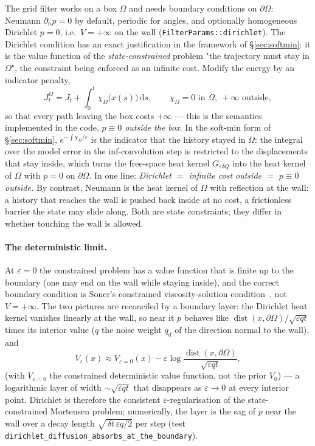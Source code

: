\documentclass[11pt,a4paper]{article}
\newcommand{\dd}{\,\mathrm{d}}
\newcommand{\eps}{\varepsilon}
\newcommand{\dt}{\,\delta t}
\theoremstyle{plain}
\theoremstyle{definition}
\theoremstyle{remark}
\begin{document}
The grid filter works on a box $\Omega$ and needs boundary conditions on $\partial\Omega$: Neumann $\partial_n p=0$ by default, periodic for angles, and optionally homogeneous Dirichlet $p=0$, i.e.\ $V=+\infty$ on the wall (\texttt{FilterParams::dirichlet}). The Dirichlet condition has an exact justification in the framework of \S\ref{sec:softmin}: it is the value function of the \emph{state-constrained} problem "the trajectory must stay in $\Omega$", the constraint being enforced as an infinite cost. Modify the energy by an indicator penalty,
\[
  J_t^{\Omega} = J_t + \int_0^t \chi_\Omega\big(x(s)\big)\dd s, \qquad \chi_\Omega = 0 \text{ in }\Omega,\ +\infty\text{ outside},
\]
so that every path leaving the box costs $+\infty$ --- this is the semantics implemented in the code, \emph{$p\equiv0$ outside the box}. In the soft-min form of \S\ref{sec:softmin}, $e^{-\int\chi_\Omega/\eps}$ is the indicator that the history stayed in $\Omega$: the integral over the model error in the inf-convolution step is restricted to the displacements that stay inside, which turns the free-space heat kernel $G_{\eps\delta Q}$ into the heat kernel of $\Omega$ with $p=0$ on $\partial\Omega$. In one line: \emph{Dirichlet $=$ infinite cost outside $=$ $p\equiv0$ outside.} By contrast, Neumann is the heat kernel of $\Omega$ with reflection at the wall: a history that reaches the wall is pushed back inside at no cost, a frictionless barrier the state may slide along. Both are state constraints; they differ in whether touching the wall is allowed.

\paragraph{The deterministic limit.}
At $\eps=0$ the constrained problem has a value function that is finite up to the boundary (one may end on the wall while staying inside), and the correct boundary condition is Soner's constrained viscosity-solution condition~\cite{Soner1986}, not $V=+\infty$. The two pictures are reconciled by a boundary layer: the Dirichlet heat kernel vanishes linearly at the wall, so near it $p$ behaves like $\operatorname{dist}(x,\partial\Omega)/\sqrt{\eps q t}$ times its interior value ($q$ the noise weight $q_d$ of the direction normal to the wall), and
\[
  V_\eps(x) \approx V_{\eps=0}(x) - \eps\log\frac{\operatorname{dist}(x,\partial\Omega)}{\sqrt{\eps q t}},
\]
(with $V_{\eps=0}$ the constrained deterministic value function, not the prior $V_0$) --- a logarithmic layer of width $\sim\sqrt{\eps q t}$ that disappears as $\eps\to0$ at every interior point. Dirichlet is therefore the consistent $\eps$-regularisation of the state-constrained Mortensen problem; numerically, the layer is the sag of $p$ near the wall over a decay length $\sqrt{\dt\,\eps q/2}$ per step (test \texttt{dirichlet\_diffusion\_absorbs\_at\_the\_boundary}).
\end{document}
